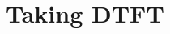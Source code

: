 \documentclass[../../course]{subfiles}
\begin{document}
\section{Taking DTFT} \label{sec:wrkTakingDTFT}
\end{document}
